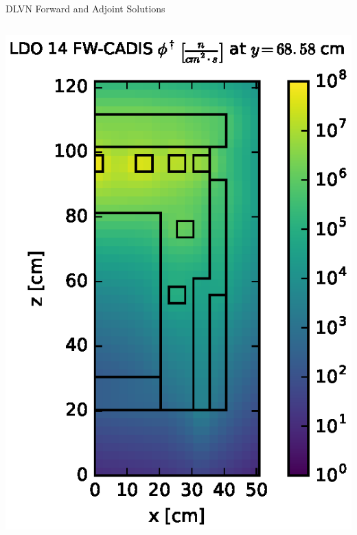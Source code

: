 \documentclass{beamer}
\begin{document}
\begin{frame}{DLVN Forward and Adjoint Solutions}
\begin{columns}
\begin{column}{0.45\textwidth}
\includegraphics[width=\textwidth]{img/flux-ldo14-slice-adj.eps}
\end{column}
\end{columns}
%
\end{frame}
\end{document}
